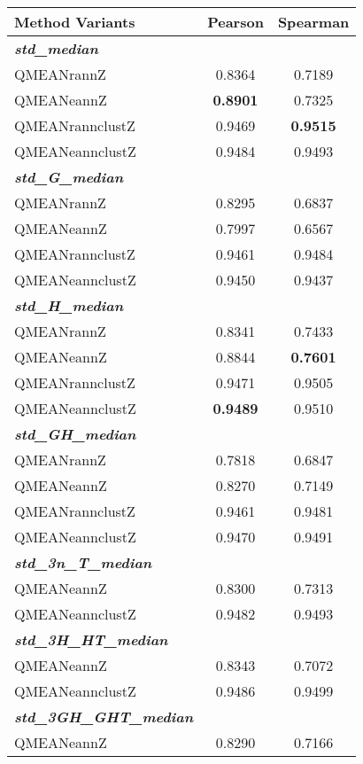 \begin{table}[htbp]
\center
\begin{tabular}{lcc}
\toprule                %
\textbf{Method Variants} & \textbf{Pearson} & \textbf{Spearman} \\
	\midrule                %
	\emph{\textbf{std\_median}}	& & \\
	QMEANrannZ	&0.8364	&0.7189\\
 	QMEANeannZ	&\textbf{0.8901}	&0.7325\\
 	QMEANrannclustZ	&0.9469	&\textbf{0.9515}\\
 	QMEANeannclustZ	&0.9484	&0.9493\\
	\midrule                %
	\emph{\textbf{std\_G\_median}}	 & &\\
	QMEANrannZ	&0.8295	&0.6837\\
 	QMEANeannZ	&0.7997	&0.6567\\
 	QMEANrannclustZ	&0.9461	&0.9484\\
 	QMEANeannclustZ	&0.9450	&0.9437\\
	\midrule                %
	\emph{\textbf{std\_H\_median}} 	& &\\
	QMEANrannZ	&0.8341	&0.7433\\
 	QMEANeannZ	&0.8844	&\textbf{0.7601}\\
 	QMEANrannclustZ	&0.9471	&0.9505\\
 	QMEANeannclustZ	&\textbf{0.9489}	&0.9510\\
	\midrule                %
	\emph{\textbf{std\_GH\_median}}	& &\\
	QMEANrannZ	&0.7818	&0.6847\\
 	QMEANeannZ	&0.8270	&0.7149\\
 	QMEANrannclustZ	&0.9461	&0.9481\\
 	QMEANeannclustZ	&0.9470	&0.9491\\
	\midrule                %
	\emph{\textbf{std\_3n\_T\_median}}	& &\\
 	QMEANeannZ	&0.8300	&0.7313\\
 	QMEANeannclustZ	&0.9482	&0.9493\\
	\midrule                %
	\emph{\textbf{std\_3H\_HT\_median}}	& &\\
	QMEANeannZ	&0.8343	&0.7072\\
	QMEANeannclustZ	&0.9486	&0.9499\\		
	\midrule                %
	\emph{\textbf{std\_3GH\_GHT\_median}}	& &\\
 	QMEANeannZ	&0.8290	&0.7166\\

\end{tabular}
\end{table}
